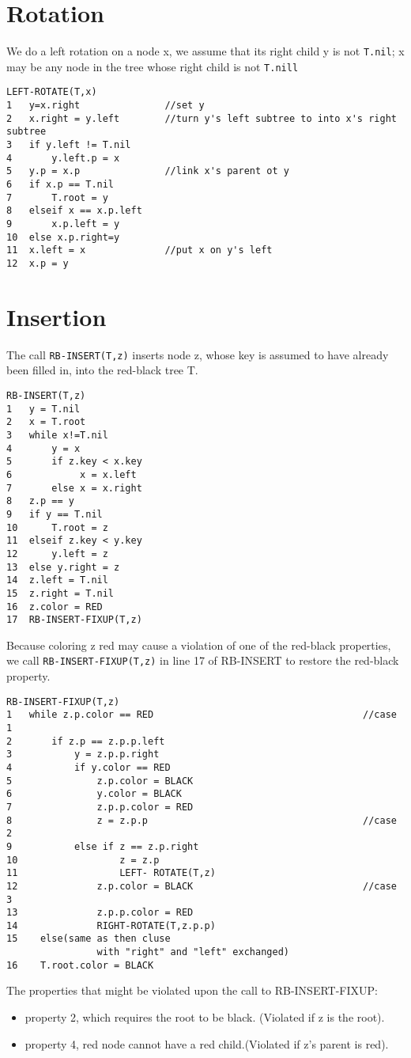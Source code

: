 \documentclass[a4paper,11pt]{book}
\begin{document}
\section{Rotation}
We do a left rotation on a node x, we assume that its right child y is not \verb|T.nil|; x may be any node in the tree whose right child is not \verb|T.nill|
\begin{verbatim}
LEFT-ROTATE(T,x)
1   y=x.right               //set y
2   x.right = y.left        //turn y's left subtree to into x's right subtree
3   if y.left != T.nil
4       y.left.p = x
5   y.p = x.p               //link x's parent ot y
6   if x.p == T.nil
7       T.root = y
8   elseif x == x.p.left
9       x.p.left = y
10  else x.p.right=y
11  x.left = x              //put x on y's left
12  x.p = y
\end{verbatim}
\section{Insertion}
The call \verb|RB-INSERT(T,z)| inserts node z, whose key is assumed to have already been filled in, into the red-black tree T.
\begin{verbatim}
RB-INSERT(T,z)
1   y = T.nil
2   x = T.root
3   while x!=T.nil
4       y = x
5       if z.key < x.key
6            x = x.left
7       else x = x.right
8   z.p == y
9   if y == T.nil
10      T.root = z
11  elseif z.key < y.key
12      y.left = z
13  else y.right = z
14  z.left = T.nil
15  z.right = T.nil
16  z.color = RED
17  RB-INSERT-FIXUP(T,z)
\end{verbatim}
Because coloring z red may cause a violation of one of the red-black properties, we call \verb|RB-INSERT-FIXUP(T,z)| in line 17 of RB-INSERT to restore the red-black property.
\begin{verbatim}
RB-INSERT-FIXUP(T,z)
1   while z.p.color == RED                                     //case 1
2       if z.p == z.p.p.left
3           y = z.p.p.right
4           if y.color == RED
5               z.p.color = BLACK
6               y.color = BLACK
7               z.p.p.color = RED
8               z = z.p.p                                      //case 2
9           else if z == z.p.right
10                  z = z.p
11                  LEFT- ROTATE(T,z)
12              z.p.color = BLACK                              //case 3
13              z.p.p.color = RED
14              RIGHT-ROTATE(T,z.p.p)
15    else(same as then cluse
                with "right" and "left" exchanged)
16    T.root.color = BLACK
\end{verbatim}
The properties that might be violated upon the call to RB-INSERT-FIXUP:
\begin{itemize}
\item property 2, which requires the root to be black. (Violated if z is the root).
\item property 4, red node cannot have a red child.(Violated if z's parent is red).
\end{itemize}
\end{document}
